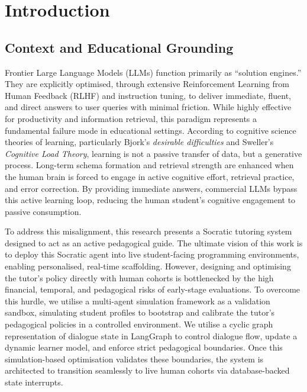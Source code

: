 \chapter{Introduction}
\label{ch:intro}

\section{Context and Educational Grounding}
Frontier Large Language Models (LLMs) function primarily as ``solution engines.'' They are explicitly optimised, through extensive Reinforcement Learning from Human Feedback (RLHF) and instruction tuning, to deliver immediate, fluent, and direct answers to user queries with minimal friction. While highly effective for productivity and information retrieval, this paradigm represents a fundamental failure mode in educational settings. According to cognitive science theories of learning, particularly Bjork's \textit{desirable difficulties} \cite{bjork1994memory} and Sweller's \textit{Cognitive Load Theory}, learning is not a passive transfer of data, but a generative process. Long-term schema formation and retrieval strength are enhanced when the human brain is forced to engage in active cognitive effort, retrieval practice, and error correction. By providing immediate answers, commercial LLMs bypass this active learning loop, reducing the human student's cognitive engagement to passive consumption.

To address this misalignment, this research presents a Socratic tutoring system designed to act as an active pedagogical guide. The ultimate vision of this work is to deploy this Socratic agent into live student-facing programming environments, enabling personalised, real-time scaffolding. However, designing and optimising the tutor's policy directly with human cohorts is bottlenecked by the high financial, temporal, and pedagogical risks of early-stage evaluations. To overcome this hurdle, we utilise a multi-agent simulation framework as a validation sandbox, simulating student profiles to bootstrap and calibrate the tutor's pedagogical policies in a controlled environment. We utilise a cyclic graph representation of dialogue state in LangGraph to control dialogue flow, update a dynamic learner model, and enforce strict pedagogical boundaries. Once this simulation-based optimisation validates these boundaries, the system is architected to transition seamlessly to live human cohorts via database-backed state interrupts.

